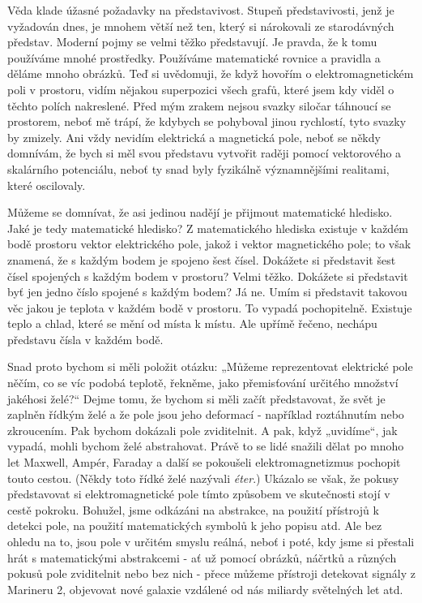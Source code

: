     Věda klade úžasné požadavky na představivost. Stupeň představivosti, jenž je vyžadován dnes, je
    mnohem větší než ten, který si nárokovali ze starodávných představ. Moderní pojmy se velmi těžko
    představují. Je pravda, že k tomu používáme mnohé prostředky. Používáme matematické rovnice a
    pravidla a děláme mnoho obrázků. Teď si uvědomuji, že když hovořím o elektromagnetickém poli v
    prostoru, vidím nějakou superpozici všech grafů, které jsem kdy viděl o těchto polích
    nakreslené. Před mým zrakem nejsou svazky siločar táhnoucí se prostorem, neboť mě trápí, že
    kdybych se pohyboval jinou rychlostí, tyto svazky by zmizely. Ani vždy nevidím elektrická a
    magnetická pole, neboť se někdy domnívám, že bych si měl svou představu vytvořit raději pomocí
    vektorového a skalárního potenciálu, neboť ty snad byly fyzikálně významnějšími realitami, které
    oscilovaly.
    
    Můžeme se domnívat, že asi jedinou nadějí je přijmout matematické hledisko. Jaké je tedy
    matematické hledisko? Z matematického hlediska existuje v každém bodě prostoru vektor
    elektrického pole, jakož i vektor magnetického pole; to však znamená, že s každým bodem je
    spojeno šest čísel. Dokážete si představit šest čísel spojených s každým bodem v prostoru? Velmi
    těžko. Dokážete si představit byť jen jedno číslo spojené s každým bodem? Já ne. Umím si
    představit takovou věc jakou je teplota v každém bodě v prostoru. To vypadá pochopitelně.
    Existuje teplo a chlad, které se mění od místa k místu. Ale upřímě řečeno, nechápu představu
    čísla v každém bodě.
    
    Snad proto bychom si měli položit otázku: „Můžeme reprezentovat elektrické pole něčím, co se víc
    podobá teplotě, řekněme, jako přemisťování určitého množství jakéhosi želé?“ Dejme tomu, že
    bychom si měli začít představovat, že svět je zaplněn řídkým želé a že pole jsou jeho deformací
    - například roztáhnutím nebo zkroucením. Pak bychom dokázali pole zviditelnit. A pak, když
    „uvidíme“, jak vypadá, mohli bychom želé abstrahovat. Právě to se lidé snažili dělat po mnoho
    let Maxwell, Ampér, Faraday a další se pokoušeli elektromagnetizmus pochopit touto cestou.
    (Někdy toto řídké želé nazývali \emph{éter}.) Ukázalo se však, že pokusy představovat si
    elektromagnetické pole tímto způsobem ve skutečnosti stojí v cestě pokroku. Bohužel, jsme
    odkázáni na abstrakce, na použití přístrojů k detekci pole, na použití matematických symbolů k
    jeho popisu atd. Ale bez ohledu na to, jsou pole v určitém smyslu reálná, neboť i poté, kdy jsme
    si přestali hrát s matematickými abstrakcemi - ať už pomocí obrázků, náčrtků a různých pokusů
    pole zviditelnit nebo bez nich - přece můžeme přístroji detekovat signály z Marineru 2,
    objevovat nové galaxie vzdálené od nás miliardy světelných let atd.
    
